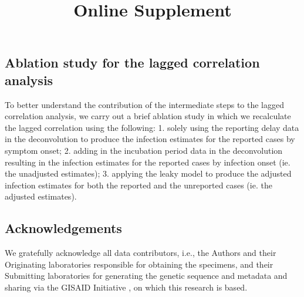 \documentclass{article}
\newcommand{\beginsupplement}{
  \setcounter{table}{1}  
  \renewcommand{\thetable}{S\arabic{table}} 
  \setcounter{figure}{1} 
  \renewcommand{\thefigure}{S\arabic{figure}}
  \setcounter{section}{0} 
  \renewcommand{\thesection}{S\arabic{section}}
}
\begin{document}

\subsection{Ablation study for the lagged correlation analysis} 

To better understand the contribution of the intermediate steps to the lagged 
correlation analysis, we carry out a brief ablation study in which we recalculate the 
lagged correlation using the following: 1. solely using the reporting delay data in 
the deconvolution to produce the infection estimates for the reported cases by symptom 
onset; 2. adding in the incubation period data in the deconvolution resulting in the 
infection estimates for the reported cases by infection onset (ie. the unadjusted estimates); 
3. applying the leaky model  to produce the adjusted infection estimates for both the reported 
and the unreported cases (ie. the adjusted estimates).

\subsection*{Acknowledgements}

We gratefully acknowledge all data contributors, i.e., the Authors and their
Originating laboratories responsible for obtaining the specimens, and their
Submitting laboratories for generating the genetic sequence and metadata and
sharing via the GISAID Initiative \citep{elbe2017data}, on which this research
is based.



\newpage


\newpage
\beginsupplement
\title{Online Supplement} 
\maketitle
\end{document}
